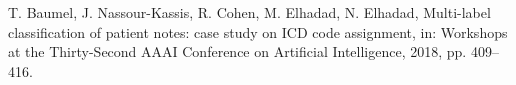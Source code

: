 \documentclass[conference]{IEEEtran}
\begin{document}
	
	\begin{thebibliography}{00}
		 T. Baumel, J. Nassour-Kassis, R. Cohen, M. Elhadad, N. Elhadad, Multi-label classification of patient notes: case study on ICD code assignment, in: Workshops at the Thirty-Second AAAI Conference on Artificial Intelligence, 2018, pp. 409–416.
			
	\end{thebibliography}
\end{document}
